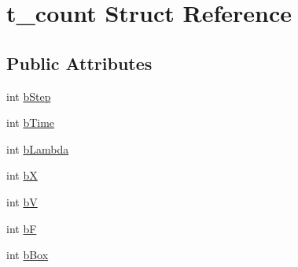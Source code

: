 \hypertarget{structt__count}{\section{t\-\_\-count \-Struct \-Reference}
\label{structt__count}
}
\subsection*{\-Public \-Attributes}
\begin{DoxyCompactItemize}
\item 
int \hyperlink{structt__count_a74788edaeb72cdb16006f141ac9107e4}{b\-Step}
\item 
int \hyperlink{structt__count_a62d6b99879bb0dff2b8858bf78451be5}{b\-Time}
\item 
int \hyperlink{structt__count_a905dd72388a78dc7b2487d4cdc41517e}{b\-Lambda}
\item 
int \hyperlink{structt__count_a1e063a027a0c3d8240db29c8a25af449}{b\-X}
\item 
int \hyperlink{structt__count_a023cd4d8be115949e03dae8b9fd0c3d0}{b\-V}
\item 
int \hyperlink{structt__count_a9dc523f347e45c5955d1bbd24fc4b70d}{b\-F}
\item 
int \hyperlink{structt__count_a416591ce977c4638a95f8879b577e57a}{b\-Box}
\end{DoxyCompactItemize}


